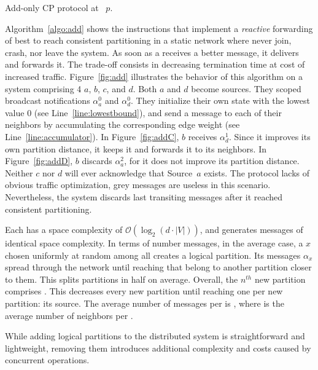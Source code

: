 \begin{algorithm}
  
  \caption{\label{algo:add}Add-only CP protocol at \Process~$p$.}
\end{algorithm}

Algorithm~\ref{algo:add} shows the instructions that implement a
\emph{reactive} forwarding of best to reach consistent partitioning in
a static network where \processes never join, crash, nor leave the
system. As soon as a \process receives a better message, it delivers
and forwards it. The trade-off consists in decreasing termination time
at cost of increased traffic.  Figure~\ref{fig:add} illustrates the
behavior of this algorithm on a system comprising 4 \processes $a$,
$b$, $c$, and $d$. Both $a$ and $d$ become sources.  They scoped broadcast
notifications $\alpha_a^0$ and $\alpha_d^0$. They initialize their own
state with the lowest value $0$ (see Line~\ref{line:lowestbound}), and
send a message to each of their neighbors by accumulating the
corresponding edge weight (see Line~\ref{line:accumulator}). In
Figure~\ref{fig:addC}, $b$ receives $\alpha_{d}^{1}$. Since it
improves its own partition distance, it keeps it and forwards it to
its neighbors. In Figure~\ref{fig:addD}, $b$ discards
$\alpha_{a}^{2}$, for it does not improve its partition
distance. Neither $c$ nor $d$ will ever acknowledge that Source~$a$
exists.  The protocol lacks of obvious traffic optimization, \eg grey
messages are useless in this scenario. Nevertheless, the system
discards last transiting messages after it reached consistent
partitioning.

Each \process has a space complexity of $\mathcal{O}(\log_2(d \cdot
|V|))$, and generates messages of identical space complexity. In terms
of number messages, in the average case, a \process $x$ chosen
uniformly at random among all \processes creates a logical
partition. Its messages $\alpha_x$ spread through the network until
reaching \processes that belong to another partition closer to
them. This splits partitions in half on average. Overall, the $n^{th}$
new partition comprises  \processes. This decreases every new
partition until reaching one \process per new partition: its
source. The average number of messages per \process is
, where  is the average
number of neighbors per \process.

While adding logical partitions to the distributed system is
straightforward and lightweight, removing them introduces additional
complexity and costs caused by concurrent operations.

